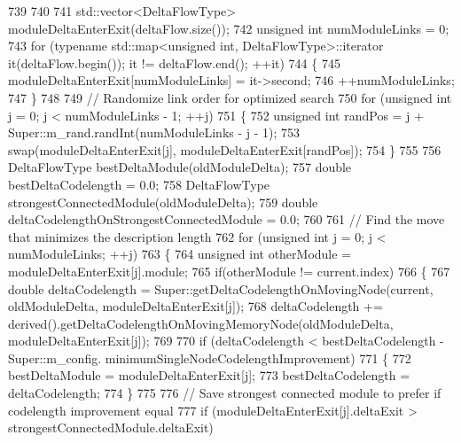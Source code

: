 \begin{DoxyCode}
739 
740 
741         std::vector<DeltaFlowType> moduleDeltaEnterExit(deltaFlow.size());
742         \textcolor{keywordtype}{unsigned} \textcolor{keywordtype}{int} numModuleLinks = 0;
743         \textcolor{keywordflow}{for} (\textcolor{keyword}{typename} std::map<unsigned int, DeltaFlowType>::iterator it(deltaFlow.begin()); it != 
      deltaFlow.end(); ++it)
744         \{
745             moduleDeltaEnterExit[numModuleLinks] = it->second;
746             ++numModuleLinks;
747         \}
748 
749         \textcolor{comment}{// Randomize link order for optimized search}
750         \textcolor{keywordflow}{for} (\textcolor{keywordtype}{unsigned} \textcolor{keywordtype}{int} j = 0; j < numModuleLinks - 1; ++j)
751         \{
752             \textcolor{keywordtype}{unsigned} \textcolor{keywordtype}{int} randPos = j + Super::m\_rand.randInt(numModuleLinks - j - 1);
753             swap(moduleDeltaEnterExit[j], moduleDeltaEnterExit[randPos]);
754         \}
755 
756         DeltaFlowType bestDeltaModule(oldModuleDelta);
757         \textcolor{keywordtype}{double} bestDeltaCodelength = 0.0;
758         DeltaFlowType strongestConnectedModule(oldModuleDelta);
759         \textcolor{keywordtype}{double} deltaCodelengthOnStrongestConnectedModule = 0.0;
760 
761         \textcolor{comment}{// Find the move that minimizes the description length}
762         \textcolor{keywordflow}{for} (\textcolor{keywordtype}{unsigned} \textcolor{keywordtype}{int} j = 0; j < numModuleLinks; ++j)
763         \{
764             \textcolor{keywordtype}{unsigned} \textcolor{keywordtype}{int} otherModule = moduleDeltaEnterExit[j].module;
765             \textcolor{keywordflow}{if}(otherModule != current.index)
766             \{
767                 \textcolor{keywordtype}{double} deltaCodelength = Super::getDeltaCodelengthOnMovingNode(current, oldModuleDelta, 
      moduleDeltaEnterExit[j]);
768                 deltaCodelength += derived().getDeltaCodelengthOnMovingMemoryNode(oldModuleDelta, 
      moduleDeltaEnterExit[j]);
769 
770                 \textcolor{keywordflow}{if} (deltaCodelength < bestDeltaCodelength - Super::m\_config.
      minimumSingleNodeCodelengthImprovement)
771                 \{
772                     bestDeltaModule = moduleDeltaEnterExit[j];
773                     bestDeltaCodelength = deltaCodelength;
774                 \}
775 
776                 \textcolor{comment}{// Save strongest connected module to prefer if codelength improvement equal}
777                 \textcolor{keywordflow}{if} (moduleDeltaEnterExit[j].deltaExit > strongestConnectedModule.deltaExit)

\end{DoxyCode}
